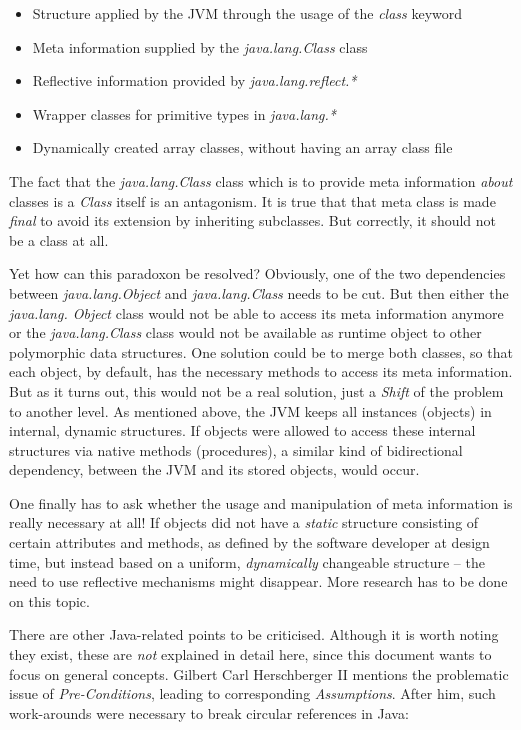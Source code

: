 \begin{itemize}
    \item[-] Structure applied by the JVM through the usage of the \emph{class} keyword
    \item[-] Meta information supplied by the \emph{java.lang.Class} class
    \item[-] Reflective information provided by \emph{java.lang.reflect.*}
    \item[-] Wrapper classes for primitive types in \emph{java.lang.*}
    \item[-] Dynamically created array classes, without having an array class file
\end{itemize}

The fact that the \emph{java.lang.Class} class which is to provide meta
information \emph{about} classes is a \emph{Class} itself is an antagonism. It
is true that that meta class is made \emph{final} to avoid its extension by
inheriting subclasses. But correctly, it should not be a class at all.

Yet how can this paradoxon be resolved? Obviously, one of the two dependencies
between \emph{java.lang.Object} and \emph{java.lang.Class} needs to be cut. But
then either the \emph{java.lang. Object} class would not be able to access its meta
information anymore or the \emph{java.lang.Class} class would not be available as
runtime object to other polymorphic data structures. One solution could be to
merge both classes, so that each object, by default, has the necessary methods
to access its meta information. But as it turns out, this would not be a real
solution, just a \emph{Shift} of the problem to another level. As mentioned above,
the JVM keeps all instances (objects) in internal, dynamic structures. If objects
were allowed to access these internal structures via native methods (procedures),
a similar kind of bidirectional dependency, between the JVM and its stored objects,
would occur.

One finally has to ask whether the usage and manipulation of meta information is
really necessary at all! If objects did not have a \emph{static} structure
consisting of certain attributes and methods, as defined by the software
developer at design time, but instead based on a uniform, \emph{dynamically}
changeable structure -- the need to use reflective mechanisms might disappear.
More research has to be done on this topic.

There are other Java-related points to be criticised. Although it is worth
noting they exist, these are \emph{not} explained in detail here, since this
document wants to focus on general concepts. Gilbert Carl Herschberger II
\cite{josgeneral} mentions the problematic issue of \emph{Pre-Conditions},
leading to corresponding \emph{Assumptions}. After him, such work-arounds were
necessary to break circular references in Java:

